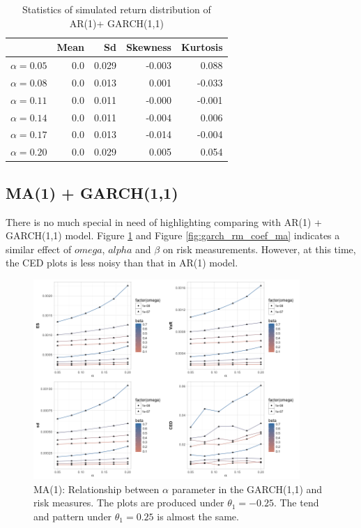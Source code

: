 \documentclass[11pt]{article}
\begin{document}
\begin{table}[H]
\centering
\begin{tabular}{|r |r r r r|}
\hline
& Mean & Sd & Skewness & Kurtosis \\
\hline
$\alpha = 0.05 $ & 0.0 & 0.029 & -0.003 & 0.088\\
$\alpha = 0.08 $ & 0.0 & 0.013 & 0.001 & -0.033\\
$\alpha = 0.11 $ & 0.0 & 0.011 & -0.000 & -0.001\\
$\alpha = 0.14 $ & 0.0 & 0.011& -0.004 &  0.006\\
$\alpha = 0.17 $ & 0.0 & 0.013 & -0.014 & -0.004\\
$\alpha = 0.20 $ & 0.0 & 0.029 & 0.005 & 0.054\\
\hline
\end{tabular}
\caption{Statistics of simulated return distribution of AR(1)+ GARCH(1,1)}
\label{table:dist_garch_ar1_return}
\end{table}


\subsection{MA(1) + GARCH(1,1)}
There is no much special in need of highlighting comparing with AR(1) + GARCH(1,1) model. Figure \ref{fig:garch_rm_alpha1_ma} and Figure \ref{fig:garch_rm_coef_ma} indicates a similar effect of $omega$, $alpha$ and $\beta$ on risk measurements.  However, at this time, the CED plots is less noisy than that in AR(1) model.

\begin{figure}[H]
\centering
\includegraphics[width = 0.9\textwidth]{../figures/simulation_garch/garch_MA1_risk_measures_neg_alpha.png}
\caption{MA(1): Relationship between $\alpha$ parameter in the GARCH(1,1) and risk measures. The plots are produced under $\theta_1 = -0.25$. The tend and pattern under $\theta_1 = 0.25$ is almost the same.}
\label{fig:garch_rm_alpha1_ma}
\end{figure}
\end{document}
